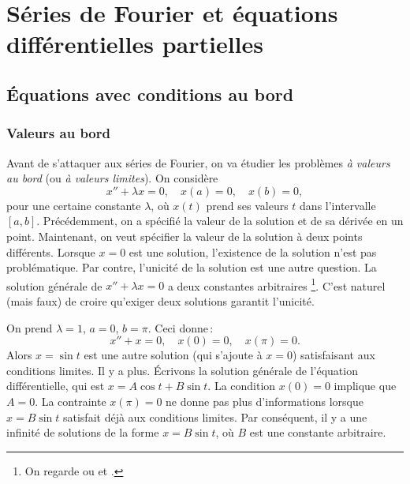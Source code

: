\chapter[Séries de Fourier et EDP]{Séries de Fourier et équations différentielles partielles} \label{FS:chapter}


\section[Conditions au bord]{Équations avec conditions au bord} \label{bvp:section}


\subsection{Valeurs au bord}

Avant de s'attaquer aux séries de Fourier, on va étudier les problèmes \emph{à valeurs au bord}
 (ou \emph{à valeurs limites}).  On considère
\begin{equation*}
x'' + \lambda x = 0, \quad x(a) = 0, \quad x(b) = 0,
\end{equation*}
pour une certaine constante $\lambda$, où $x(t)$ prend ses valeurs  $t$ dans l'intervalle 
$[a,b]$.
Précédemment, on a spécifié la valeur de la solution et de sa dérivée en un point. Maintenant, on veut spécifier la valeur de la solution à deux points différents. Lorsque $x=0$ est une solution, l'existence de la solution n'est pas problématique. Par contre, l'unicité de la solution est une autre question. La solution générale de  $x'' + \lambda x = 0$ a deux constantes arbitraires \footnote{%
On regarde  ou  et
.}.
C'est naturel (mais faux) de croire qu'exiger deux solutions garantit l'unicité. 

\begin{example}
On prend $\lambda = 1$,
$a=0$, $b=\pi$.  Ceci donne\,: 
\begin{equation*}
x'' + x = 0, \quad x(0) = 0, \quad x(\pi) = 0.
\end{equation*}
Alors $x = \sin t$ est une autre solution  (qui s'ajoute à  $x=0$) satisfaisant aux conditions limites. Il y a plus. Écrivons la solution générale de l'équation différentielle, qui est  $x= A \cos t + B \sin t$.
La condition $x(0) = 0$ implique que $A=0$.  La contrainte $x(\pi) = 0$ ne donne pas plus d'informations lorsque $x = B \sin t$ satisfait déjà aux conditions limites. 
Par conséquent, il y a une infinité de solutions de la forme  $x = B \sin t$,
où $B$ est une constante arbitraire.  
\end{example}

